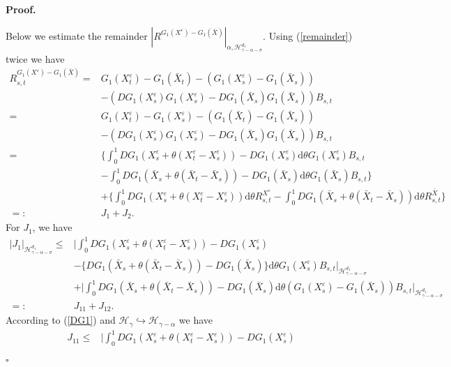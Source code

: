 \documentclass[10pt,a4paper]{article}
\numberwithin{equation}{section}
\newenvironment{proof}[1][\normalfont\bfseries Proof]{%
	\noindent #1.\hspace{0.5em}%
	\ignorespaces%
}{%
	\hfill $\square$%
	\par%
}
\begin{document}
\begin{proof}
	
	Below we estimate the remainder $|R^{G_1(X^\varepsilon)-G_1(\bar{X})} |_{\alpha, \mathcal H_{\gamma-\alpha-\sigma}^{d_1} }$.
	Using (\ref{remainder}) twice we have
	\begin{align*}
		R_{s,t}^{G_1(X^\varepsilon)-G_1(\bar{X})}
		=&G_1(X_t^\varepsilon)-G_1(\bar{X}_t)-(G_1(X_s^\varepsilon)-G_1(\bar{X}_s))  \nonumber\\ &-(DG_1(X_s^\varepsilon)G_1(X_s^\varepsilon)-DG_1(\bar{X}_s)G_1(\bar{X}_s)) B_{s,t} \nonumber\\
		=& G_1(X_t^\varepsilon)-G_1(X_s^\varepsilon)-(G_1(\bar{X}_t)-G_1(\bar{X}_s)) \nonumber\\
		&-(DG_1(X_s^\varepsilon)G_1(X_s^\varepsilon)-DG_1(\bar{X}_s)G_1(\bar{X}_s)) B_{s,t} \nonumber\\
		=& \bigg\{\int_0^1 DG_1(X_s^\varepsilon+\theta (X_t^\varepsilon-X_s^\varepsilon))-DG_1(X_s^\varepsilon) \mathrm{d} \theta G_1(X_s^\varepsilon)  B_{s,t} \nonumber\\
		&-\int_0^1 DG_1(\bar{X}_s+\theta (\bar{X}_t-\bar{X}_s))-DG_1(\bar{X}_s) \mathrm{d} \theta G_1(\bar{X}_s)  B_{s,t} \bigg\}\nonumber\\
		&+\bigg\{ \int_0^1 DG_1(X_s^\varepsilon+\theta (X_t^\varepsilon-X_s^\varepsilon)) \mathrm{d} \theta R_{s,t}^{X^\varepsilon}
		-\int_0^1 DG_1(\bar{X}_s+\theta (\bar{X}_t-\bar{X}_s)) \mathrm{d} \theta R_{s,t}^{\bar{X}} \bigg\} \nonumber\\
		=: & J_1 + J_2.
	\end{align*}	
	For $J_1$, we have
	\begin{align*}%
		|J_1 |_{\mathcal H_{\gamma-\alpha-\sigma}^{d_1} }
		\leq & \bigg| \int_0^1 DG_1(X_s^\varepsilon+\theta (X_t^\varepsilon-X_s^\varepsilon))-DG_1(X_s^\varepsilon)   \nonumber\\
		&-\{ DG_1(\bar{X}_s+\theta (\bar{X}_t-\bar{X}_s))-DG_1(\bar{X}_s)\} \mathrm{d} \theta G_1(X_s^\varepsilon)  B_{s,t} \bigg|_{\mathcal H_{\gamma-\alpha-\sigma}^{d_1} }  \nonumber\\
		&+ \bigg|\int_0^1 DG_1(\bar{X}_s+\theta (\bar{X}_t-\bar{X}_s))-DG_1(\bar{X}_s) \mathrm{d} \theta (G_1(X_s^\varepsilon)-G_1(\bar{X}_s)) B_{s,t}  \bigg|_{\mathcal H_{\gamma-\alpha-\sigma}^{d_1} }  \nonumber\\
		=: & J_{11}+J_{12}.
	\end{align*}	
	According to (\ref{DG1}) and $\mathcal H_\gamma \hookrightarrow \mathcal H_{\gamma-\alpha}$ we have
	\begin{align}\label{J11}
		J_{11} \leq &\bigg| \int_0^1 DG_1(X_s^\varepsilon+\theta (X_t^\varepsilon-X_s^\varepsilon))-DG_1(X_s^\varepsilon)   \nonumber\\

\end{align}
\end{proof}
\end{document}
